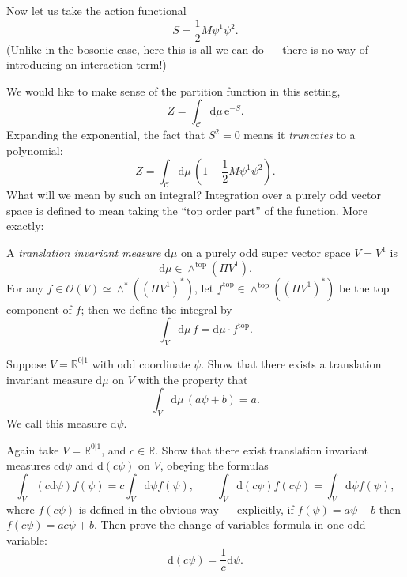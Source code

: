 \documentclass[12pt,letterpaper,reqno]{article}
\numberwithin{equation}{section}
\newcommand{\cC}{\ensuremath{\mathcal C}}
\newcommand{\cO}{\ensuremath{\mathcal O}}
\newcommand{\R}{\ensuremath{\mathbb R}}
\newcommand{\half}{\ensuremath{\frac{1}{2}}}
\newcommand{\e}{{\mathrm e}}
\newcommand{\de}{\mathrm{d}}
\newcommand{\rmtop}{\mathrm{top}}
\newcommand{\ti}[1]{\textit{#1}}
\begin{document}
Now let us take the action functional
\begin{equation}
  S = \half M \psi^1 \psi^2.
\end{equation}
(Unlike in the bosonic case, here this is all we can do --- there is no 
way of introducing an interaction term!)

We would like to make sense of the partition function in this setting,
\begin{equation} \label{eq:2-fermion-partition-function}
  Z = \int_\cC \de\mu \, \e^{-S}.
\end{equation}
Expanding the exponential, the fact that $S^2 = 0$ means it \ti{truncates} to a polynomial:
\begin{equation} \label{eq:2-fermion-partition-function-expanded}
  Z = \int_\cC \de \mu \, \left(1 - \half M \psi^1 \psi^2\right).
\end{equation}
What will we mean by such an integral?
Integration over a purely odd vector space is defined to mean taking the
``top order part'' of the function.
More exactly: 

\begin{defn} \label{defn:odd-integral} A \ti{translation invariant measure} $\de \mu$ 
on a purely odd super vector space $V = V^1$
is
\begin{equation} \label{eq:measure-odd-vector-space}
  \de \mu \in \wedge^\rmtop(\Pi V^1).
\end{equation}
For any $f \in \cO(V) \simeq \wedge^*((\Pi V^1)^*)$, let
$f^\rmtop \in \wedge^\rmtop((\Pi V^1)^*)$ be the top component of $f$; then
we define the integral by
\begin{equation}
  \int_V \de \mu \, f = \de\mu \cdot f^\rmtop.
\end{equation}
\end{defn}

\begin{exercise} Suppose $V = \R^{0 \vert 1}$ with odd coordinate $\psi$.
Show that there exists a translation invariant measure $\de \mu$ on $V$ with the property that
\begin{equation}
\int_V \de \mu \, (a \psi + b) = a.
\end{equation}
We call this measure $\de \psi$.
\end{exercise}

\begin{exercise} Again take $V = \R^{0 \vert 1}$, and $c \in \R$.
Show that there exist translation invariant measures $c \de \psi$ and $\de (c \psi)$
on $V$, obeying the formulas
\begin{equation}
  \int_V (c \de \psi) f(\psi) = c \int_V \de \psi f(\psi), \qquad \int_V \de(c \psi) f(c \psi) = \int_V \de \psi f(\psi),
\end{equation}
where $f(c \psi)$ is defined in the obvious way --- explicitly,
if $f(\psi) = a \psi + b$ then $f(c \psi) = a c \psi + b$.
Then prove the change of variables formula in one odd variable:
\begin{equation}
  \de (c \psi) = \frac{1}{c} \de \psi.
\end{equation}
\end{exercise}
\end{document}
